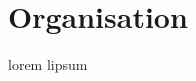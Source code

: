 \section{Organisation}

\begin{frame}
\tableofcontents[currentsection]
\end{frame}
\begin{frame}
lorem lipsum
\end{frame}